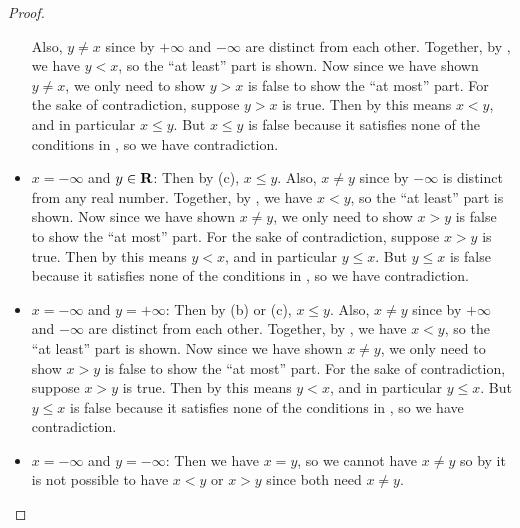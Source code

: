 \begin{proof}
\begin{itemize}
    Also, \(y \ne x\) since by  \(+\infty\) and \(-\infty\) are distinct from each other.
    Together, by , we have \(y < x\), so the ``at least'' part is shown.
    Now since we have shown \(y \ne x\), we only need to show \(y > x\) is false to show the ``at most'' part.
    For the sake of contradiction, suppose \(y > x\) is true. Then by  this means \(x < y\), and in particular \(x \le y\).
    But \(x \le y\) is false because it satisfies none of the conditions in , so we have contradiction.
\item \(x = -\infty\) and \(y \in \mathbf{R}\):
    Then by (c), \(x \le y\).
    Also, \(x \ne y\) since by  \(-\infty\) is distinct from any real number.
    Together, by , we have \(x < y\), so the ``at least'' part is shown.
    Now since we have shown \(x \ne y\), we only need to show \(x > y\) is false to show the ``at most'' part.
    For the sake of contradiction, suppose \(x > y\) is true. Then by  this means \(y < x\), and in particular \(y \le x\).
    But \(y \le x\) is false because it satisfies none of the conditions in , so we have contradiction.
\item \(x = -\infty\) and \(y = +\infty\):
    Then by (b) or (c), \(x \le y\).
    Also, \(x \ne y\) since by  \(+\infty\) and \(-\infty\) are distinct from each other.
    Together, by , we have \(x < y\), so the ``at least'' part is shown.
    Now since we have shown \(x \ne y\), we only need to show \(x > y\) is false to show the ``at most'' part.
    For the sake of contradiction, suppose \(x > y\) is true. Then by  this means \(y < x\), and in particular \(y \le x\).
    But \(y \le x\) is false because it satisfies none of the conditions in , so we have contradiction.
\item \(x = -\infty\) and \(y = -\infty\):
    Then we have \(x = y\), so we cannot have \(x \ne y\) so by  it is not possible to have \(x < y\) or \(x > y\) since both need \(x \ne y\).
\end{itemize}


\end{proof}
